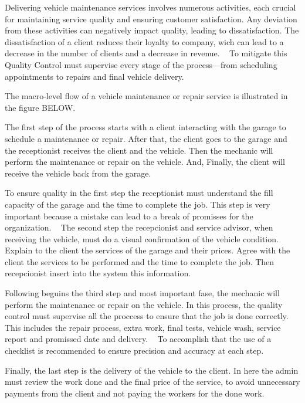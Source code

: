 Delivering vehicle maintenance services involves numerous activities, each crucial for maintaining service quality and ensuring customer satisfaction. 
Any deviation from these activities can negatively impact quality, leading to dissatisfaction. 
The dissatisfaction of a client reduces their loyalty to company, wich can lead to a decrease in the number of clients and a decrease in revenue. ~\cite{Setting_the_after_sale_process}
To mitigate this Quality Control must supervise every stage of the process—from scheduling appointments to repairs and final vehicle delivery. ~\cite{Setting_the_after_sale_process}

The macro-level flow of a vehicle maintenance or repair service is illustrated in the figure BELOW. 

The first step of the process starts with a client interacting with the garage to schedule a maintenance or repair. 
After that, the client goes to the garage and the receptionist receives the client and the vehicle.
Then the mechanic will perform the maintenance or repair on the vehicle.
And, Finally, the client will receive the vehicle back from the garage.

To ensure quality in the first step the receptionist must understand the fill capacity of the garage and the time to complete the job. 
This step is very important because a mistake can lead to a break of promisses for the organization. ~\cite{Setting_the_after_sale_process}
The second step the recepcionist and service advisor, when receiving the vehicle, must do a visual confirmation of the vehicle condition. ~\cite{Setting_the_after_sale_process}
Explain to the client the services of the garage and their prices. Agree with the client the services to be performed and the time to complete the job. 
Then recepcionist insert into the system this information. ~\cite{Setting_the_after_sale_process}

Following beguins the third step and most important fase, the mechanic will perform the maintenance or repair on the vehicle. 
In this process, the quality control must supervise all the proccess to ensure that the job is done correctly. ~\cite{Setting_the_after_sale_process}
This includes the repair process, extra work, final tests, vehicle wash, service report and promissed date and delivery. ~\cite{Setting_the_after_sale_process}
To accomplish that the use of a checklist is recommended to ensure precision and accuracy at each step. ~\cite{Setting_the_after_sale_process}

Finally, the last step is the delivery of the vehicle to the client. 
In here  the admin must review the work done and the final price of the service, to avoid unnecessary payments from the client and not paying the workers for the done work. ~\cite{Setting_the_after_sale_process}

